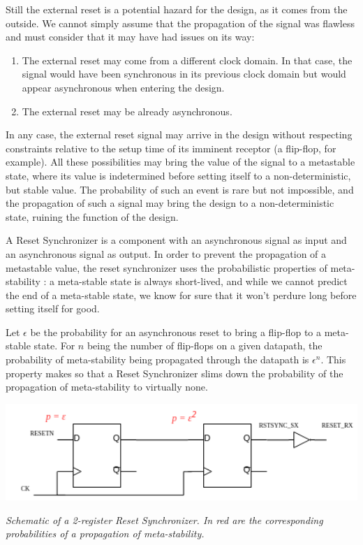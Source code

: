 \documentclass[a4paper]{article}
\begin{document}
Still the external reset is a potential hazard for the design, as it comes from the outside. We cannot
simply assume that the propagation of the signal was flawless and must consider that it may have
had issues on its way:
\begin{enumerate}
  \item The external reset may come from a different clock domain. In that case, the signal would have
  been synchronous in its previous clock domain but would appear asynchronous when entering the design.
  \item The external reset may be already asynchronous.
\end{enumerate}
In any case, the external reset signal may arrive in the design without respecting constraints relative
to the setup time of its imminent receptor (a flip-flop, for example).
All these possibilities may bring the value of the signal to a metastable state, where its value is
indetermined before setting itself to a non-deterministic, but stable value. The probability of such an
event is rare but not impossible, and the propagation of such a signal may bring the design to a
non-deterministic state, ruining the function of the design.

A Reset Synchronizer is a component with an asynchronous signal as input and an asynchronous signal as
output. In order to prevent the propagation of a metastable value, the reset synchronizer uses the
probabilistic properties of meta-stability : a meta-stable state is always short-lived, and while we
cannot predict the end of a meta-stable state, we know for sure that it won't perdure long before
setting itself for good.

Let $\epsilon$ be the probability for an asynchronous reset to bring a flip-flop to a meta-stable state.
For $n$ being the number of flip-flops on a given datapath, the probability of meta-stability being propagated
through the datapath is $\epsilon^n$. This property makes so that a Reset Synchronizer slims down the
probability of the propagation of meta-stability to virtually none.

\includegraphics[width=15cm]{./reset_synchronizer.png}
\begin{center}
  {\it Schematic of a 2-register Reset Synchronizer. In red are the corresponding probabilities of a
  propagation of meta-stability.}
\end{center}
\end{document}
